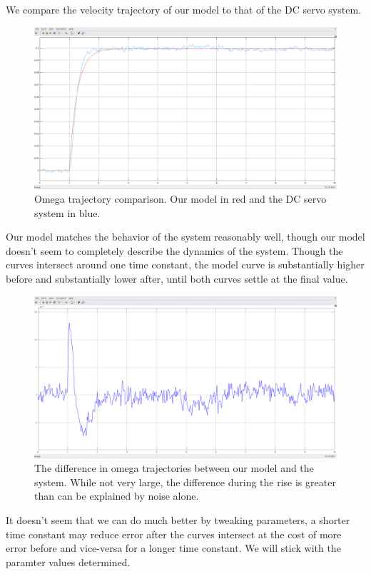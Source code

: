 \documentclass[11pt,a4paper]{article}
\begin{document}
We compare the velocity trajectory of our model to that of the DC servo system. 

\begin{figure}[H]
\includegraphics[width=\textwidth]{imglab/lab2sol_comp2.png}
\caption{Omega trajectory comparison. Our model in red and the DC servo system in blue. }
\label{fig:comp2}
\end{figure}

Our model matches the behavior of the system reasonably well, though our model doesn't seem to completely describe the dynamics of the system. Though the curves intersect around one time constant, the model curve is substantially higher before and substantially lower after, until both curves settle at the final value.

\begin{figure}[H]
\includegraphics[width=\textwidth]{imglab/lab2sol_mismatch.png}
\caption{The difference in omega trajectories between our model and the system. While not very large, the difference during the rise is greater than can be explained by noise alone. }
\label{fig:comp3}
\end{figure}

It doesn't seem that we can do much better by tweaking parameters, a shorter time constant may reduce error after the curves intersect  at the cost of more error before and vice-versa for a longer time constant. We will stick with the paramter values determined.
\\
\end{document}
